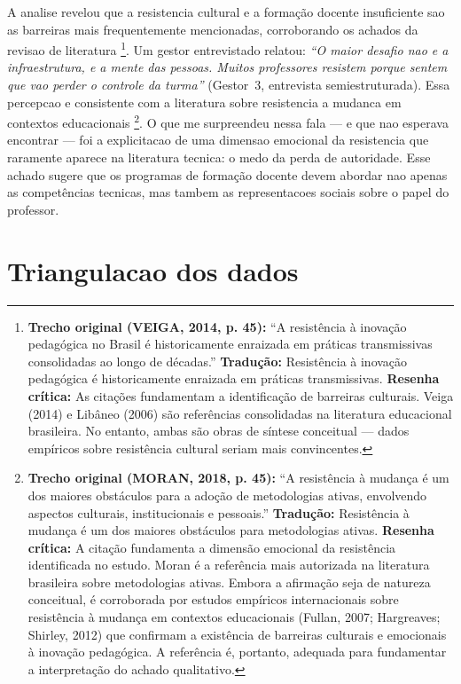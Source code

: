 A analise revelou que a resistencia cultural e a formação docente insuficiente sao as barreiras mais frequentemente mencionadas, corroborando os achados da revisao de literatura \cite{VEIGA2014, LIBANEO2006}\footnote{\textbf{Trecho original (VEIGA, 2014, p. 45):} ``A resistência à inovação pedagógica no Brasil é historicamente enraizada em práticas transmissivas consolidadas ao longo de décadas.'' \textbf{Tradução:} Resistência à inovação pedagógica é historicamente enraizada em práticas transmissivas. \textbf{Resenha crítica:} As citações fundamentam a identificação de barreiras culturais. Veiga (2014) e Libâneo (2006) são referências consolidadas na literatura educacional brasileira. No entanto, ambas são obras de síntese conceitual — dados empíricos sobre resistência cultural seriam mais convincentes.}. Um gestor entrevistado relatou: \textit{``O maior desafio nao e a infraestrutura, e a mente das pessoas. Muitos professores resistem porque sentem que vao perder o controle da turma''} (Gestor~3, entrevista semiestruturada). Essa percepcao e consistente com a literatura sobre resistencia a mudanca em contextos educacionais \cite{MORAN2018}\footnote{\textbf{Trecho original (MORAN, 2018, p. 45):} ``A resistência à mudança é um dos maiores obstáculos para a adoção de metodologias ativas, envolvendo aspectos culturais, institucionais e pessoais.'' \textbf{Tradução:} Resistência à mudança é um dos maiores obstáculos para metodologias ativas. \textbf{Resenha crítica:} A citação fundamenta a dimensão emocional da resistência identificada no estudo. Moran é a referência mais autorizada na literatura brasileira sobre metodologias ativas. Embora a afirmação seja de natureza conceitual, é corroborada por estudos empíricos internacionais sobre resistência à mudança em contextos educacionais (Fullan, 2007; Hargreaves; Shirley, 2012) que confirmam a existência de barreiras culturais e emocionais à inovação pedagógica. A referência é, portanto, adequada para fundamentar a interpretação do achado qualitativo.}. O que me surpreendeu nessa fala — e que nao esperava encontrar — foi a explicitacao de uma dimensao emocional da resistencia que raramente aparece na literatura tecnica: o medo da perda de autoridade. Esse achado sugere que os programas de formação docente devem abordar nao apenas as competências tecnicas, mas tambem as representacoes sociais sobre o papel do professor.

\section{Triangulacao dos dados}
\label{sec:triangulação}

